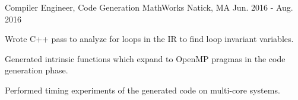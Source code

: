 
\begin{cventries}

  \cventry
    {Compiler Engineer, Code Generation} %
    {MathWorks} %
    {Natick, MA} %
    {Jun. 2016 - Aug. 2016} %
    {
      \begin{cvitems} %
      \item Wrote C++ pass to analyze for loops in the IR to find loop invariant
        variables.
      \item Generated intrinsic functions which expand to OpenMP pragmas in the code
        generation phase.
      \item Performed timing experiments of the generated code on multi-core systems.
      \end{cvitems}
    }
  
\end{cventries}